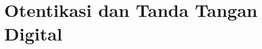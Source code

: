 \documentclass[../main.tex]{subfiles}
\begin{document}
\chapter{Otentikasi dan Tanda Tangan Digital}
\end{document}

